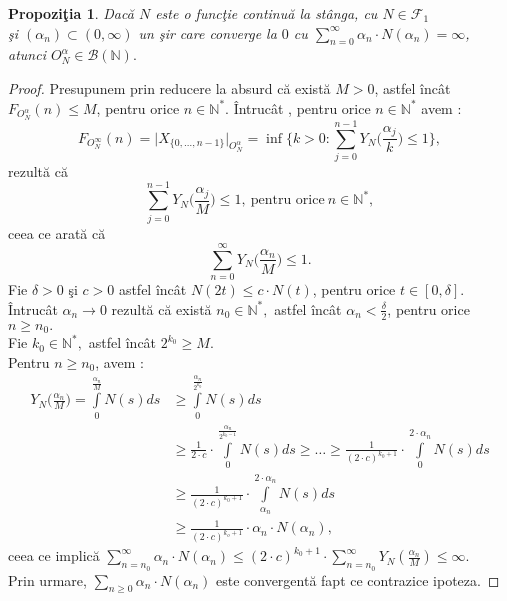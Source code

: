 \documentclass[ a4paper, 12pt]{report}
\newtheorem{prop}[theorem]{\bf Propozi\c tia }
\theoremstyle{definition}
\theoremstyle{remark}
\numberwithin{equation}{section}
\begin{document}
\begin{prop}
Dac\u a $N$ este o func\c tie continu\u a la st\^anga, cu $N \in \mathcal{F}_{1}$ \\\c si $(\alpha_n) \subset (0,\infty)$ un \c sir care converge la $0$ cu $\sum\limits_{n=0}^{\infty} \alpha_n \cdot N(\alpha_n) = \infty$,
 atunci $O_N^{\alpha} \in \mathcal{B}(\mathbb{N}).$
\end{prop}
\begin{proof}
Presupunem prin reducere la absurd c\u a exist\u a $M > 0$, astfel \^inc\^at $F_{O_{N}^{\alpha}}(n) \leq M$, pentru orice $n \in \mathbb{N}^{\ast}$. \^Intruc\^at , pentru orice $n \in \mathbb{N}^{\ast}$ avem : \[F_{O_{N}^{\infty}}(n) = \lvert X_{\{0,\ldots,n-1 \}} \rvert_{O_{N}^{\alpha}} = \inf\Big\{ k>0 : \sum\limits_{j=0}^{n-1} Y_N \Big(\frac{\alpha_j}{k}\Big) \leq 1\Big\},\] rezult\u a c\u a \[\sum\limits_{j=0}^{n-1} Y_N\Big(\frac{\alpha_j}{M}\Big) \leq 1,\ \mbox{pentru orice}\  n \in \mathbb{N}^{\ast},\] ceea ce arat\u a c\u a \[\sum\limits_{n=0}^{\infty}Y_N\Big(\frac{\alpha_n}{M}\Big) \leq 1.\]
Fie $\delta>0$ \c si $c > 0$ astfel \^inc\^at $N(2t) \leq c \cdot N(t)$, pentru orice $t \in [0,\delta]$. \^Intruc\^at $\alpha_n \longrightarrow 0$  rezult\u a c\u a exist\u a $n_0 \in \mathbb{N}^{\ast},$ astfel \^inc\^at $\alpha_n < \frac{\delta}{2}$, pentru orice $n \geq n_0.$\\
Fie $k_0 \in \mathbb{N}^{\ast},$ astfel \^inc\^at $2^{k_{0}} \geq M.$ \\
Pentru $n \geq n_0$, avem :
\begin{align*}
Y_N\Big(\frac{\alpha_n}{M}\Big) = \int\limits_0^{\frac{\alpha_n}{M}} N(s)ds&\geq\int\limits_0^{\frac{\alpha_n}{2^{k_{0}}}} N(s) ds\\
 &\geq \frac{1}{2 \cdot c}\cdot \int\limits_{0}^{\frac{\alpha_n}{2^{k_{0}-1}}} N(s)ds\geq \ldots \geq \frac{1}{(2 \cdot c)^{k_{0}+1}} \cdot \int\limits_{0}^{2 \cdot \alpha_n} N(s)ds\\
   &\geq \frac{1}{(2 \cdot c)^{k_{0}+1}} \cdot \int\limits_{\alpha_n}^{2 \cdot \alpha_n}N(s)ds\\
   &\geq \frac{1}{(2 \cdot c)^{k_{o}+1}} \cdot \alpha_n \cdot N(\alpha_n),
\end{align*} ceea ce implic\u a  $\sum\limits_{n=n_0}^{\infty} \alpha_n \cdot N(\alpha_n) \leq (2 \cdot c)^{k_{0}+1} \cdot \sum\limits_{n=n_0}^{\infty} Y_N(\frac{\alpha_n}{M}) \leq \infty.$\\
Prin urmare, $\sum\limits_{n \geq 0} \alpha_n \cdot N(\alpha_n)$ este convergent\u a  fapt ce contrazice ipoteza.
\end{proof}
\end{document}
